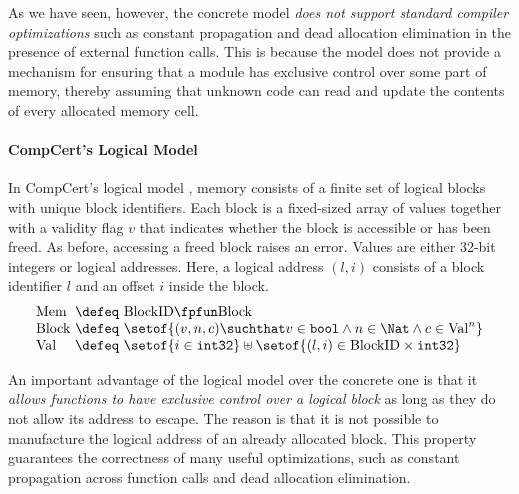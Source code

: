 As we have seen, however, the concrete model \emph{does not support 
standard compiler optimizations} such as constant propagation and 
dead allocation elimination in the presence of external function
calls.  This is because the model does not provide 
a mechanism for ensuring that a module has exclusive control over some
part of memory, thereby assuming that unknown code can read and 
update the contents of every allocated memory cell.


\paragraph{CompCert's Logical Model}

In CompCert's logical model
\cite{leroy:compcert,Leroy-Appel-Blazy-Stewart-memory-v2}, memory
consists of a finite set of logical blocks with unique block
identifiers.  Each block is a fixed-sized array of values together
with a validity flag $v$ that indicates whether the block is accessible or
has been freed. As before, accessing a freed block raises an error.
Values are either 32-bit integers or logical addresses.  Here, a
logical address $(l,i)$ consists of a block identifier $l$ and an
offset $i$ inside the block.
\[
\begin{array}{@{}l@{~}c@{~}l@{}}
\mathrm{Mem} &\defeq& \mathrm{BlockID} \fpfun \mathrm{Block} \\
\mathrm{Block} &\defeq&
\setof{(v, n, c) \suchthat
  v \in \mathtt{bool} \land n \in \Nat \land c \in \mathrm{Val}^n } \\
\mathrm{Val} &\defeq& \setof{i\in\mathtt{int32}} \uplus \setof{(l,i) \in \mathrm{BlockID}\times \mathtt{int32}}
\end{array}
\]

An important advantage of the logical model over the concrete one is that 
it \emph{allows functions to have exclusive control over a logical block} as 
long as they do not allow its address to escape. The reason is that it
is not possible to manufacture the logical address of an already allocated block.  
This property guarantees the correctness of many useful optimizations, 
such as constant propagation across function calls and dead allocation
elimination.

